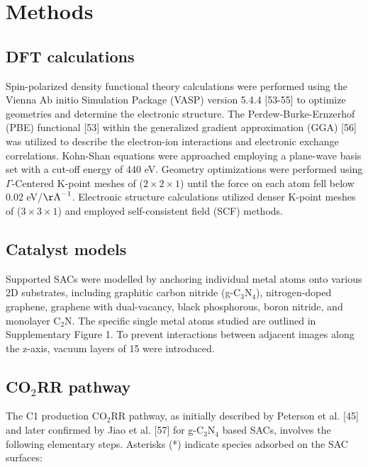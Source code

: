 

\section{Methods}

\subsection{DFT calculations}
Spin-polarized density functional theory calculations were performed using the Vienna Ab initio Simulation Package (VASP) version 5.4.4 [53-55] to optimize geometries and determine the electronic structure.
The Perdew-Burke-Ernzerhof (PBE) functional [53] within the generalized gradient approximation (GGA) [56] was utilized to describe the electron-ion interactions and electronic exchange correlations.
Kohn-Shan equations were approached employing a plane-wave basis set with a cut-off energy of 440 eV.
Geometry optimizations were performed using $\Gamma$-Centered K-point meshes of ($2\times2\times1$) until the force on each atom fell below 0.02 eV/\(\mathrm{\AA}^{-1}\).
Electronic structure calculations utilized denser K-point meshes of ($3\times3\times1$) and employed self-consistent field (SCF) methods.


\subsection{Catalyst models}
Supported SACs were modelled by anchoring individual metal atoms onto various 2D substrates, including graphitic carbon nitride (g-C$_3$N$_4$), nitrogen-doped graphene, graphene with dual-vacancy, black phosphorous, boron nitride, and monolayer C$_2$N.
The specific single metal atoms studied are outlined in Supplementary Figure 1.
To prevent interactions between adjacent images along the z-axis, vacuum layers of 15 \text{\AA} were introduced.


\subsection{CO$_2$RR pathway}
The C1 production CO$_2$RR pathway, as initially described by Peterson et al. [45] and later confirmed by Jiao et al. [57] for g-C$_3$N$_4$ based SACs, involves the following elementary steps.
Asterisks (*) indicate species adsorbed on the SAC surfaces:


